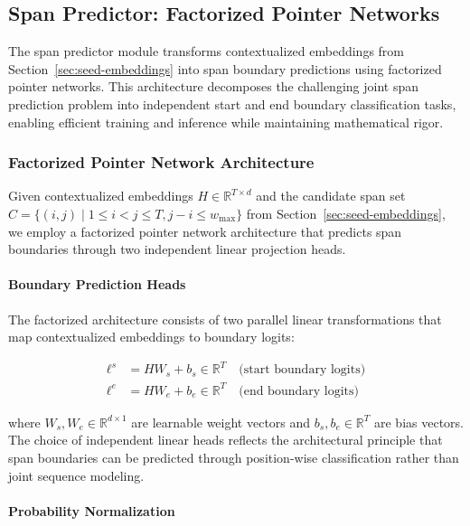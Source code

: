\subsection{Span Predictor: Factorized Pointer Networks}
\label{sec:span-predictor}

The span predictor module transforms contextualized embeddings from Section~\ref{sec:seed-embeddings} into span boundary predictions using factorized pointer networks. This architecture decomposes the challenging joint span prediction problem into independent start and end boundary classification tasks, enabling efficient training and inference while maintaining mathematical rigor.

\subsubsection{Factorized Pointer Network Architecture}
\label{sec:factorized-architecture}

Given contextualized embeddings \(H \in \mathbb{R}^{T \times d}\) and the candidate span set \(C = \{(i,j) \mid 1 \leq i < j \leq T, j - i \leq w_{\max}\}\) from Section~\ref{sec:seed-embeddings}, we employ a factorized pointer network architecture that predicts span boundaries through two independent linear projection heads.

\paragraph{Boundary Prediction Heads}

The factorized architecture consists of two parallel linear transformations that map contextualized embeddings to boundary logits:

\begin{align}
\ell^s &= H W_s + b_s \in \mathbb{R}^T \quad \text{(start boundary logits)} \label{eq:start-logits} \\
\ell^e &= H W_e + b_e \in \mathbb{R}^T \quad \text{(end boundary logits)} \label{eq:end-logits}
\end{align}

where \(W_s, W_e \in \mathbb{R}^{d \times 1}\) are learnable weight vectors and \(b_s, b_e \in \mathbb{R}^T\) are bias vectors. The choice of independent linear heads reflects the architectural principle that span boundaries can be predicted through position-wise classification rather than joint sequence modeling.

\paragraph{Probability Normalization}

